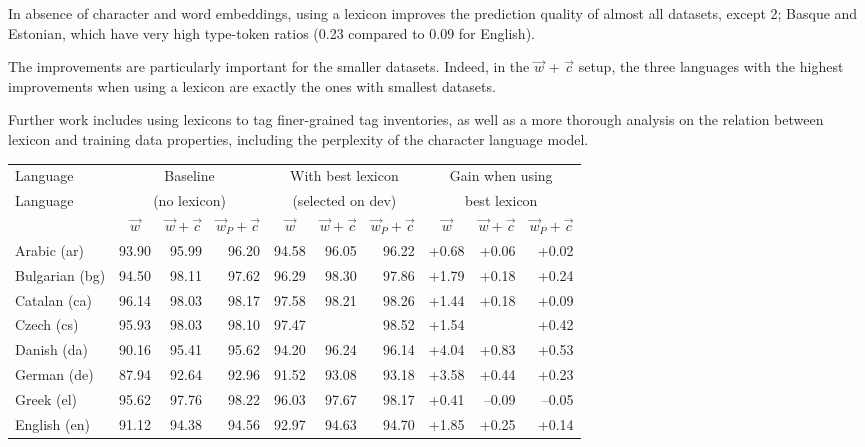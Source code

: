 \documentclass[11pt,letterpaper]{article}
\begin{document}
In absence of character and word embeddings, using a lexicon improves the prediction quality of almost all datasets, except 2; Basque and Estonian, which have very high type-token ratios (0.23 compared to 0.09 for English).

The improvements are particularly important for the smaller datasets. Indeed, in the $\vec{w}$ + $\vec{c}$ setup, the three languages with the highest improvements when using a lexicon are exactly the ones with smallest datasets.

Further work includes using lexicons to tag finer-grained tag inventories, as well as a more thorough analysis on the relation between lexicon and training data properties, including the perplexity of the character language model.

\begin{table}
\centering\footnotesize
\begin{tabular}{l|rrr|rrr|rrr}
\toprule
Language & \multicolumn{3}{c}{Baseline} & \multicolumn{3}{c}{With best lexicon} & \multicolumn{3}{c}{Gain when using} \\
Language & \multicolumn{3}{c}{(no lexicon)} & \multicolumn{3}{c}{(selected on dev)} & \multicolumn{3}{c}{best lexicon} \\
 & \multicolumn{1}{c}{$\vec{w}$} & \multicolumn{1}{c}{$\vec{w}+\vec{c}$} & \multicolumn{1}{c}{$\vec{w}_P+\vec{c}$} & \multicolumn{1}{c}{$\vec{w}$} & \multicolumn{1}{c}{$\vec{w}+\vec{c}$} & \multicolumn{1}{c}{$\vec{w}_P+\vec{c}$} & \multicolumn{1}{c}{$\vec{w}$} & \multicolumn{1}{c}{$\vec{w}+\vec{c}$} & \multicolumn{1}{c}{$\vec{w}_P+\vec{c}$} \\
\midrule
Arabic (ar) & 93.90 & 95.99 & 96.20 & 94.58 & 96.05 & 96.22 & +0.68 & +0.06 & +0.02\\
Bulgarian (bg) & 94.50 & 98.11 & 97.62 & 96.29 & 98.30 & 97.86 & +1.79 & +0.18 & +0.24\\
Catalan (ca) & 96.14 & 98.03 & 98.17 & 97.58 & 98.21 & 98.26 & +1.44 & +0.18 & +0.09\\
Czech (cs) & 95.93 & 98.03 & 98.10 & 97.47 &  & 98.52 & +1.54 &  & +0.42\\
Danish (da) & 90.16 & 95.41 & 95.62 & 94.20 & 96.24 & 96.14 & +4.04 & +0.83 & +0.53\\
German (de) & 87.94 & 92.64 & 92.96 & 91.52 & 93.08 & 93.18 & +3.58 & +0.44 & +0.23\\
Greek (el) & 95.62 & 97.76 & 98.22 & 96.03 & 97.67 & 98.17 & +0.41 & --0.09 & --0.05\\
English (en) & 91.12 & 94.38 & 94.56 & 92.97 & 94.63 & 94.70 & +1.85 & +0.25 & +0.14\\

\end{tabular}
\end{table}
\end{document}

